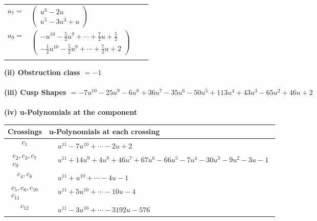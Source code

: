 \documentclass[1p]{elsarticle_modified}
\theoremstyle{definition}
\begin{document}
\begin{tabular}{m{7pt} m{180pt} m{7pt} m{180pt} }
\flushright $a_{7}=$&$\begin{pmatrix}u^3-2 u\\u^5-3 u^3+u\end{pmatrix}$ \\
\flushright $a_{9}=$&$\begin{pmatrix}- u^{10}-\frac{5}{2} u^9+\cdots+\frac{7}{2} u+\frac{5}{2}\\-\frac{1}{2} u^{10}-\frac{5}{2} u^9+\cdots+\frac{7}{2} u+2\end{pmatrix}$\\&\end{tabular}
\flushleft \textbf{(ii) Obstruction class $= -1$}\\~\\
\flushleft \textbf{(iii) Cusp Shapes $= -7 u^{10}-25 u^9-6 u^8+36 u^7-35 u^6-50 u^5+113 u^4+43 u^3-65 u^2+46 u+2$}\\~\\
\newpage\renewcommand{\arraystretch}{1}
\flushleft \textbf{(iv) u-Polynomials at the component}\newline \\
\begin{tabular}{m{50pt}|m{274pt}}
Crossings & \hspace{64pt}u-Polynomials at each crossing \\
\hline $$\begin{aligned}c_{1}\end{aligned}$$&$\begin{aligned}
&u^{11}-7 u^{10}+\cdots-2 u+2
\end{aligned}$\\
\hline $$\begin{aligned}c_{2},c_{3},c_{7}\\c_{9}\end{aligned}$$&$\begin{aligned}
&u^{11}+14 u^9+4 u^8+46 u^7+67 u^6-66 u^5-7 u^4-30 u^3-9 u^2-3 u-1
\end{aligned}$\\
\hline $$\begin{aligned}c_{4},c_{8}\end{aligned}$$&$\begin{aligned}
&u^{11}+u^{10}+\cdots-4 u-1
\end{aligned}$\\
\hline $$\begin{aligned}c_{5},c_{6},c_{10}\\c_{11}\end{aligned}$$&$\begin{aligned}
&u^{11}+5 u^{10}+\cdots-10 u-4
\end{aligned}$\\
\hline $$\begin{aligned}c_{12}\end{aligned}$$&$\begin{aligned}
&u^{11}-3 u^{10}+\cdots-3192 u-576
\end{aligned}$\\
\hline
\end{tabular}\\~\\
\end{document}

